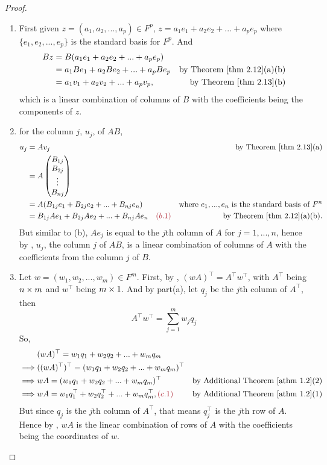 \begin{proof} \ 
\begin{enumerate}
\item First given \(z = (a_1, a_2, ..., a_p) \in F^p\), \(z = a_1 e_1 + a_2 e_2 + ... + a_p e_p\) where \(\{ e_1, e_2, ..., e_p \}\) is the standard basis for \(F^p\).
And
\begin{align*}
    Bz & = B(a_1 e_1 + a_2 e_2 + ... + a_p e_p) \\
       & = a_1 B e_1 + a_2 B e_2 + ... + a_p B e_p & \text{by \THM{2.12}(a)(b)} \\
       & = a_1 v_1 + a_2 v_2 + ... + a_p v_p, & \text{by \THM{2.13}(b)}
\end{align*}
which is a linear combination of columns of \(B\) with the coefficients being the components of \(z\).

\item for the column \(j\), \(u_j\), of \(AB\),
\begin{align*}
    u_j & = A v_j & \text{by \THM{2.13}(a)} \\
        & = A \begin{pmatrix}
              B_{1j} \\ B_{2j} \\ \vdots \\ B_{nj}
          \end{pmatrix} \\
        & = A (B_{1j} e_1 + B_{2j} e_2 + ... + B_{nj} e_n) & \text{where \(e_1, ..., e_n\) is the standard basis of \(F^n\)} \\
        & = B_{1j} A e_1 + B_{2j} A e_2 + ... + B_{nj} A e_n \MAROON{\ \ \ (b.1)} & \text{by \THM{2.12}(a)(b)}.
\end{align*}
But similar to (b), \(A e_j\) is equal to the \(j\)th column of \(A\) for \(j = 1, ..., n\), hence by , \(u_j\), the column \(j\) of \(AB\), is a linear combination of columns of \(A\) with the coefficients from the column \(j\) of \(B\).

\item
Let \(w = (w_1, w_2, ..., w_m) \in F^m\).
First, by , \((wA)^\top = A^\top w^\top\), with \(A^\top\) being \(n \times m\) and \(w^\top\) being \(m \times 1\).
And by part(a), let \(q_j\) be the \(j\)th column of \(A^\top\), then
\[
    A^\top w^\top = \sum_{j = 1}^m w_j q_j
\]
So,
\begin{align*}
             & (wA)^\top = w_1 q_1 + w_2 q_2 + ... + w_m q_m \\
    \implies & ((wA)^\top)^\top = (w_1 q_1 + w_2 q_2 + ... + w_m q_m)^\top \\
    \implies & wA = (w_1 q_1 + w_2 q_2 + ... + w_m q_m)^\top & \text{by \ATHM{1.2}(2)} \\
    \implies & wA = w_1 q_1^\top + w_2 q_2^\top + ... + w_m q_m^\top,  & \text{by \ATHM{1.2}(1)}
\end{align*}
But since \(q_j\) is the \(j\)th column of \(A^\top\), that means \(q_j^\top\) is the \(j\)th row of \(A\).
Hence by \MAROON{(c.1)}, \(wA\) is the linear combination of rows of \(A\) with the coefficients being the coordinates of \(w\).


\end{enumerate}
\end{proof}
